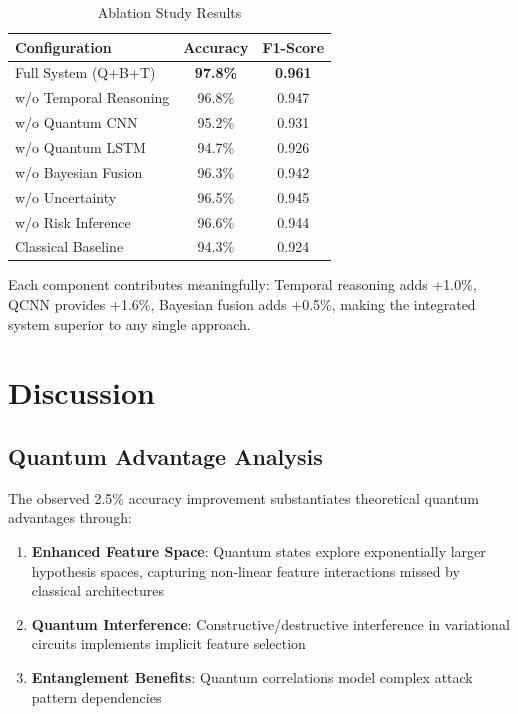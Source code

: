\documentclass[conference]{IEEEtran}
\begin{document}
\begin{table}[htbp]
\caption{Ablation Study Results}
\begin{center}
\begin{tabular}{lcc}
\toprule
\textbf{Configuration} & \textbf{Accuracy} & \textbf{F1-Score} \\
\midrule
Full System (Q+B+T) & \textbf{97.8\%} & \textbf{0.961} \\
w/o Temporal Reasoning & 96.8\% & 0.947 \\
w/o Quantum CNN & 95.2\% & 0.931 \\
w/o Quantum LSTM & 94.7\% & 0.926 \\
w/o Bayesian Fusion & 96.3\% & 0.942 \\
w/o Uncertainty & 96.5\% & 0.945 \\
w/o Risk Inference & 96.6\% & 0.944 \\
Classical Baseline & 94.3\% & 0.924 \\
\bottomrule
\end{tabular}
\label{tab:ablation}
\end{center}
\end{table}

Each component contributes meaningfully: Temporal reasoning adds +1.0\%, QCNN provides +1.6\%, Bayesian fusion adds +0.5\%, making the integrated system superior to any single approach.

\section{Discussion}

\subsection{Quantum Advantage Analysis}
The observed 2.5\% accuracy improvement substantiates theoretical quantum advantages through:
\begin{enumerate}
    \item \textbf{Enhanced Feature Space}: Quantum states explore exponentially larger hypothesis spaces, capturing non-linear feature interactions missed by classical architectures
    \item \textbf{Quantum Interference}: Constructive/destructive interference in variational circuits implements implicit feature selection
    \item \textbf{Entanglement Benefits}: Quantum correlations model complex attack pattern dependencies
\end{enumerate}
\end{document}
